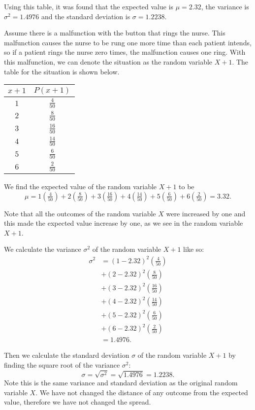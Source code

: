 Using this table, it was found that the expected value is \(\mu=2.32\), the variance is \(\sigma^2=1.4976\) and the standard deviation is \(\sigma=1.2238\).

\begin{example}
Assume there is a malfunction with the button that rings the nurse. This malfunction causes the nurse to be rung one more time than each patient intends, so if a patient rings the nurse zero times, the malfunction causes one ring. With this malfunction, we can denote the situation as the random variable \(X+1\). The table for the situation is shown below.

\begin{center}
\begin{tabular}{c|c}
\(x+1\)	&	\(P(x+1)\)	\\ \hline \hline
\(1\)	&	\(\tfrac{4}{50}\)	\\ \hline 
\(2\)	&	\(\tfrac{8}{50}\)	\\ \hline
\(3\)	&	\(\tfrac{16}{50}\)	\\ \hline
\(4\)	&	\(\tfrac{14}{50}\)	\\ \hline
\(5\)	&	\(\tfrac{6}{50}\)	\\ \hline
\(6\)	&	\(\tfrac{2}{50}\)	\\ 
\end{tabular}
\end{center}

We find the expected value of the random variable \(X+1\) to be
\[\mu=1(\tfrac{4}{50})+2(\tfrac{8}{50})+3(\tfrac{16}{50})+4(\tfrac{14}{50})+5(\tfrac{6}{50})+6(\tfrac{2}{50})=3.32.\]

Note that all the outcomes of the random variable \(X\) were increased by one and this made the expected value increase by one, as we see in the random variable \(X+1\).

We calculate the variance \(\sigma^2\) of the random variable \(X+1\) like so:
\begin{align*}
\sigma^2 &=(1-2.32)^2(\tfrac{4}{50}) \\
  &+(2-2.32)^2(\tfrac{8}{50}) \\ 
  &+(3-2.32)^2(\tfrac{16}{50}) \\
  &+(4-2.32)^2(\tfrac{14}{50}) \\
  &+(5-2.32)^2(\tfrac{6}{50}) \\
  &+(6-2.32)^2(\tfrac{2}{50}) \\
  &=1.4976.
\end{align*}

Then we calculate the standard deviation \(\sigma\) of the random variable \(X+1\) by finding the square root of the variance \(\sigma^2\):
\[  
\sigma = \sqrt{\sigma^2} = \sqrt{1.4976} = 1.2238.
\]
Note this is the same variance and standard deviation as the original random variable \(X\). We have not changed the distance of any outcome from the expected value, therefore we have not changed the spread. 
\end{example}

